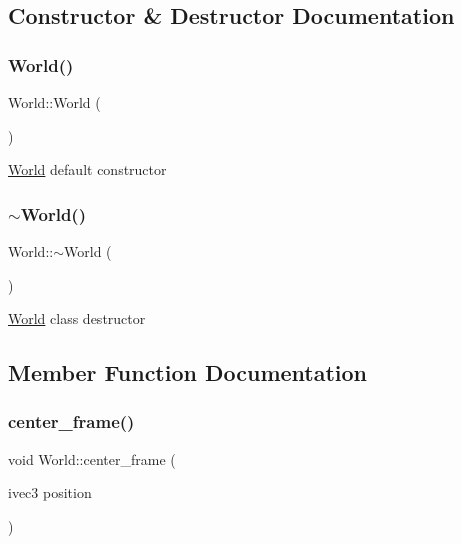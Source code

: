 \subsection{Constructor \& Destructor Documentation}
\mbox{\label{classWorld_afa39d4e6f714a7a3691ac0c656f5e8a8}} 
\subsubsection{\texorpdfstring{World()}{World()}}
{\footnotesize\ttfamily World\+::\+World (\begin{DoxyParamCaption}{ }\end{DoxyParamCaption})}

\mbox{\hyperlink{classWorld}{World}} default constructor \mbox{\label{classWorld_a8c73fba541a5817fff65147ba47cd827}} 
\subsubsection{\texorpdfstring{$\sim$\+World()}{~World()}}
{\footnotesize\ttfamily World\+::$\sim$\+World (\begin{DoxyParamCaption}{ }\end{DoxyParamCaption})}

\mbox{\hyperlink{classWorld}{World}} class destructor 

\subsection{Member Function Documentation}
\mbox{\label{classWorld_a867700693b18b37cc9b5a1b8ba818286}} 
\subsubsection{\texorpdfstring{center\+\_\+frame()}{center\_frame()}}
{\footnotesize\ttfamily void World\+::center\+\_\+frame (\begin{DoxyParamCaption}\item[{ivec3}]{position }\end{DoxyParamCaption})}


